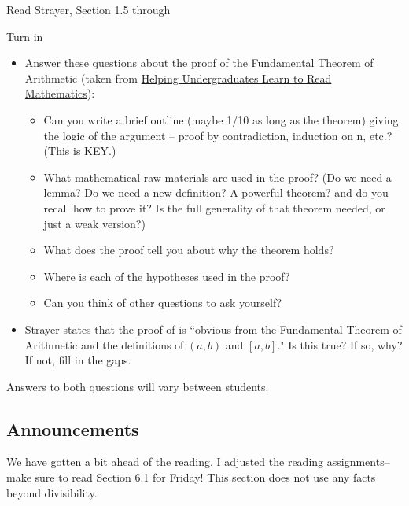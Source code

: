 \documentclass{ximera}
\begin{document}
\begin{pre}
 \item[Read] Strayer, Section 1.5 through 
 \item[Turn in] 
 \begin{itemize}
	\item Answer these questions about the proof of the Fundamental Theorem of Arithmetic (taken from \href{https://maa.org/node/121566}{Helping Undergraduates Learn to Read Mathematics}):
	
	\begin{itemize}
		\item Can you write a brief outline (maybe 1/10 as long as the theorem) giving the logic of the argument -- proof by contradiction, induction on n, etc.? (This is KEY.)
		\item What mathematical raw materials are used in the proof? (Do we need a lemma? Do we need a new definition? A powerful theorem? and do you recall how to prove it? Is the full generality of that theorem needed, or just a weak version?)
		\item What does the proof tell you about why the theorem holds?
		\item Where is each of the hypotheses used in the proof?
		\item Can you think of other questions to ask yourself?
	\end{itemize}

\item Strayer states that the proof of  is ``obvious from the Fundamental Theorem of Arithmetic and the definitions of $(a,b)$ and $[a,b]$." Is this true? If so, why? If not, fill in the gaps.
 \end{itemize}

 
\begin{solution}
Answers to both questions will vary between students.
\end{solution}
\end{pre}

\subsection{Announcements}
We have gotten a bit ahead of the reading. I adjusted the reading assignments--make sure to read Section 6.1 for Friday! This section does not use any facts beyond divisibility.

\end{document}
